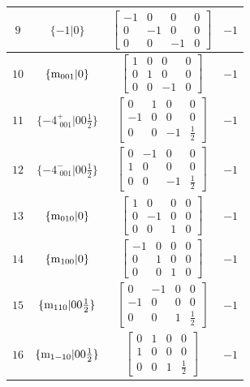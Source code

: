 \documentclass[fleqn,8pt]{jsarticle}
\begin{document}
\begin{longtable}{cccc}
$ 9 $ & $ \{-1|0\} $ & $ \begin{bmatrix} -1 & 0 & 0 & 0 \\ 0 & -1 & 0 & 0 \\ 0 & 0 & -1 & 0 \end{bmatrix} $ & $ -1 $ \\ \hline
$ 10 $ & $ \{{\rm m}_{001}|0\} $ & $ \begin{bmatrix} 1 & 0 & 0 & 0 \\ 0 & 1 & 0 & 0 \\ 0 & 0 & -1 & 0 \end{bmatrix} $ & $ -1 $ \\ \hline
$ 11 $ & $ \{-4^{+}_{\,\,001}|0 0 \frac{1}{2}\} $ & $ \begin{bmatrix} 0 & 1 & 0 & 0 \\ -1 & 0 & 0 & 0 \\ 0 & 0 & -1 & \frac{1}{2} \end{bmatrix} $ & $ -1 $ \\ \hline
$ 12 $ & $ \{-4^{-}_{\,\,001}|0 0 \frac{1}{2}\} $ & $ \begin{bmatrix} 0 & -1 & 0 & 0 \\ 1 & 0 & 0 & 0 \\ 0 & 0 & -1 & \frac{1}{2} \end{bmatrix} $ & $ -1 $ \\ \hline
$ 13 $ & $ \{{\rm m}_{010}|0\} $ & $ \begin{bmatrix} 1 & 0 & 0 & 0 \\ 0 & -1 & 0 & 0 \\ 0 & 0 & 1 & 0 \end{bmatrix} $ & $ -1 $ \\ \hline
$ 14 $ & $ \{{\rm m}_{100}|0\} $ & $ \begin{bmatrix} -1 & 0 & 0 & 0 \\ 0 & 1 & 0 & 0 \\ 0 & 0 & 1 & 0 \end{bmatrix} $ & $ -1 $ \\ \hline
$ 15 $ & $ \{{\rm m}_{110}|0 0 \frac{1}{2}\} $ & $ \begin{bmatrix} 0 & -1 & 0 & 0 \\ -1 & 0 & 0 & 0 \\ 0 & 0 & 1 & \frac{1}{2} \end{bmatrix} $ & $ -1 $ \\ \hline
$ 16 $ & $ \{{\rm m}_{1-10}|0 0 \frac{1}{2}\} $ & $ \begin{bmatrix} 0 & 1 & 0 & 0 \\ 1 & 0 & 0 & 0 \\ 0 & 0 & 1 & \frac{1}{2} \end{bmatrix} $ & $ -1 $ \\
\end{longtable}
\end{document}
